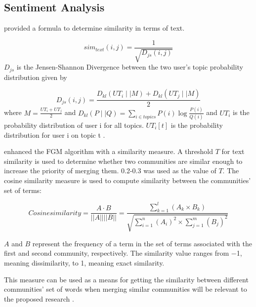 \subsection{Sentiment Analysis}
\label{subsec:sentiana}

 provided a formula to determine similarity in terms of text. 

\begin{equation}
sim_{text}(i,j) = \frac{1}{\sqrt{D_{js}(i,j)}}
\end{equation}$D_{js}$ is the Jensen-Shannon Divergence between the two user’s topic probability distribution given by

\begin{equation}
D_{js}(i,j) = \frac{D_{kl}(UT_i \mid\mid M) + D_{kl}(UT_j \mid\mid M)}{2}
\end{equation}where $M = \frac{UT_i + UT_j}{2}$ and $D_{kl}(P \mid\mid Q) = \sum_{i \in topics} P(i) \log{\frac{P(i)}{Q(i)}}$ and $UT_i$ is the probability distribution of user i for all topics. $UT_i[t]$ is the probability distribution for user i on topic t \cite{Zhang:2012}.

 enhanced the FGM algorithm with a similarity measure. A threshold $T$ for text similarity is used to determine whether two communities are similar enough to increase the priority of merging them. 0.2-0.3 was used as the value of $T$. The cosine similarity measure is used to compute similarity between the communities' set of terms:

\begin{equation}
Cosine similarity = \frac {A \cdot B}{||A|| ||B||} = \frac {\sum_{k = 1}^{l}(A_k \times B_k)}{\sqrt{\sum_{i = 1}^{n} (A_i)^2 \times \sum_{j = 1}^{m} (B_j)^2}}
\end{equation}

$A$ and $B$ represent the frequency of a term in the set of terms associated with the first and second community, respectively. The similarity value ranges from −1, meaning dissimilarity, to 1, meaning exact similarity.

This measure can be used as a means for getting the similarity between different communities’ set of words when merging similar communities will be relevant to the proposed research \cite{Bakillah:2014}.

